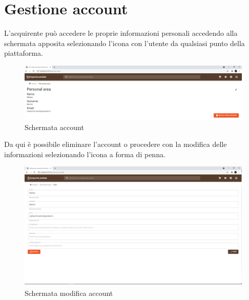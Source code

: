 \section{Gestione account}\label{ModificaProf}
L'acquirente può accedere le proprie informazioni personali accedendo alla schermata apposita selezionando l'icona con l'utente da qualsiasi punto della piattaforma.
\begin{figure}[H]
	\centering
	\includegraphics[scale=0.3]{Immagini/Acquirente/Personal Area.png}
	\caption{Schermata account}
	\label{fig:Account}
\end{figure}
Da qui è possibile eliminare l'account o procedere con la modifica delle informazioni selezionando l'icona a forma di penna.
\begin{figure}[H]
	\centering
	\includegraphics[scale=0.3]{Immagini/Acquirente/Change Password.png}
	\caption{Schermata modifica account}
	\label{fig:ModificaAccount}
\end{figure}
